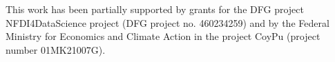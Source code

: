 \documentclass[
]{ceurart}
\begin{document}
\begin{acknowledgments}
This work has been partially supported by grants for the DFG project NFDI4DataScience project (DFG project no. 460234259) and by the Federal Ministry for Economics and Climate Action in the project CoyPu (project number 01MK21007G). 
\end{acknowledgments}

\end{document}
